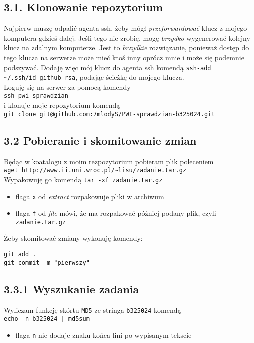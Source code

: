 \documentclass[a4paper, 11pt]{article}
\begin{document}
\subsection*{3.1. Klonowanie repozytorium}
Najpierw muszę odpalić agenta ssh, żeby mógł \emph{przeforwardować} klucz z mojego komputera gdzieś dalej. Jeśli tego nie zrobię, mogę \emph{brzydko} wygenerować
kolejny klucz na zdalnym komputerze. Jest to \emph{brzydkie} rozwiązanie, ponieważ dostęp do tego klucza na serwerze może mieć ktoś inny oprócz mnie
i może się podemnie podszywać. Dodaję więc mój klucz do agenta ssh komendą \verb+ssh-add ~/.ssh/id_github_rsa+, podając ścieżkę do mojego klucza.\\
Loguję się na serwer za pomocą komendy\\
\verb+ssh pwi-sprawdzian+\\ 
i klonuje moje repozytorium komendą\\
\verb+git clone git@github.com:7mlodyS/PWI-sprawdzian-b325024.git+

\subsection*{3.2 Pobieranie i skomitowanie zmian}
Będąc w koatalogu z moim rezpozytorium pobieram plik poleceniem \\
\verb+wget http://www.ii.uni.wroc.pl/~lisu/zadanie.tar.gz+ \\
Wypakowuję go komendą 
\verb+tar -xf zadanie.tar.gz+
\begin{itemize}
    \item flaga \verb+x+ od \emph{extract} rozpakowuje pliki w archiwum
    \item flaga \verb+f+ od \emph{file} mówi, że ma rozpakować później podany plik, czyli \verb+zadanie.tar.gz+
\end{itemize}
Żeby skomitować zmiany wykonuję komendy:
\begin{verbatim}
git add .
git commit -m "pierwszy"
\end{verbatim}

\subsection*{3.3.1 Wyszukanie zadania}
Wyliczam funkcję skórtu \verb+MD5+ ze stringa \verb+b325024+ komendą \\ 
\verb+echo -n b325024 | md5sum+
\begin{itemize}
    \item flaga \verb+n+ nie dodaje znaku końca lini po wypisanym tekscie
\end{itemize}
\end{document}
